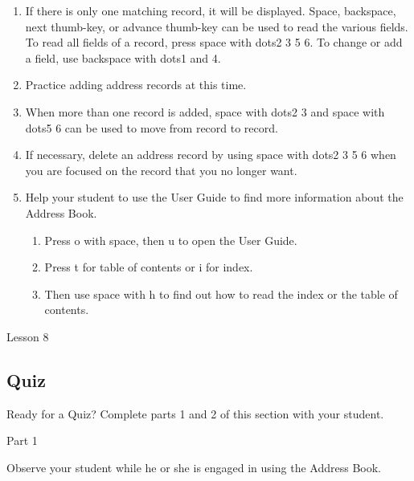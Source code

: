 \documentclass[10pt,letterpaper,twoside]{report}
\begin{document}
{{{{\begin{enumerate}
	\item If there is only one matching record, it will be displayed.  Space, backspace, next thumb-key, or advance thumb-key can be used to read the various fields.  To read all fields of a record, press space with dots2 3 5 6.  To change or add a field, use backspace with dots1 and 4.
	      
	\item Practice adding address records at this time.
	      
	\item When more than one record is added, space with dots2 3 and space with dots5 6 can be used to move from record to record.
	      
	\item If necessary, delete an address record by using space with dots2 3 5 6 when you are focused on the record that you no longer want.
	      
	\item Help your student to use the User Guide to find more information about the Address Book.
	      
	      \begin{enumerate}
		      \item Press o with space, then u to open the User Guide.
		            
		      \item Press t for table of contents or i for index.
		            
		      \item Then use space with h to find out how to read the index or the table of contents.
	      \end{enumerate}
\end{enumerate}





\clearpage

\newpage
Lesson 8

\subsection{Quiz}



Ready for a Quiz? Complete parts 1 and 2 of this section with your student.



Part 1



Observe your student while he or she is engaged in using the Address Book.



}}}}
\end{document}
